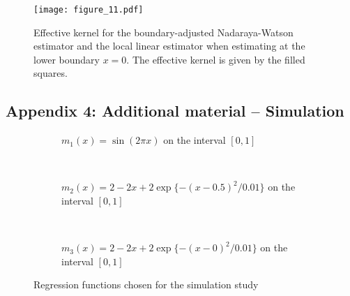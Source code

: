 \begin{figure}
	\centering
	\texttt{[image: figure\_11.pdf]}
	\caption{Effective kernel for the boundary-adjusted Nadaraya-Watson estimator and the local linear estimator when estimating at the lower boundary $x = 0$.
			 The effective kernel is given by the filled squares.}
	\label{fig:effective_kernel_nw_boundary}
\end{figure}

\clearpage

\subsection*{Appendix 4: Additional material -- Simulation}
\vfill
\begin{figure}[h!]
	\centering
	\begin{subfigure}{\textwidth}
		\centering
		\caption{$m_1(x) = \sin(2 \pi x)$ on the interval $[0, 1]$}
		\label{fig:m_1}
	\end{subfigure}
	\\[2ex]
	\begin{subfigure}{\textwidth}
		\centering
		\caption{$m_2(x) = 2 - 2x + 2\exp \{ - (x - 0.5)^2 / 0.01 \} $ on the interval $[0, 1]$}
		\label{fig:m_2}
	\end{subfigure}
	\\[2ex]
	\begin{subfigure}{\textwidth}
		\centering
		\caption{$m_3(x) = 2 - 2x + 2\exp \{ - (x - 0)^2 / 0.01 \} $ on the interval $[0, 1]$}
		\label{fig:m_3}
	\end{subfigure}
	\caption{Regression functions chosen for the simulation study}
	\label{fig:simulation_functions}
\end{figure}

